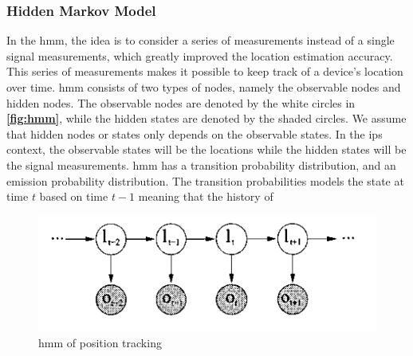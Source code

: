 \subsubsection{Hidden Markov Model}
In the \gls{hmm}, the idea is to consider a series of measurements instead of a single signal measurements, which greatly improved the location estimation accuracy. This series of measurements makes it possible to keep track of a device's location over time. \gls{hmm} consists of two types of nodes, namely the observable nodes and hidden nodes. The observable nodes are denoted by the white circles in \textbf{\autoref{fig:hmm}}, while the hidden states are denoted by the shaded circles. We assume that hidden nodes or states only depends on the observable states. In the \gls{ips} context, the observable states will be the locations while the hidden states will be the signal measurements. \gls{hmm} has a transition probability distribution, and an emission probability distribution. The transition probabilities models the state at time $t$ based on time $t-1$ meaning that the history of 
\begin{figure}[h]
    \centering
    \includegraphics[scale=1.6]{Images/ProblemAnalysis/hmm_pe.PNG}
    \caption{\gls{hmm} of position tracking}
    \label{fig:hmm}
\end{figure}
